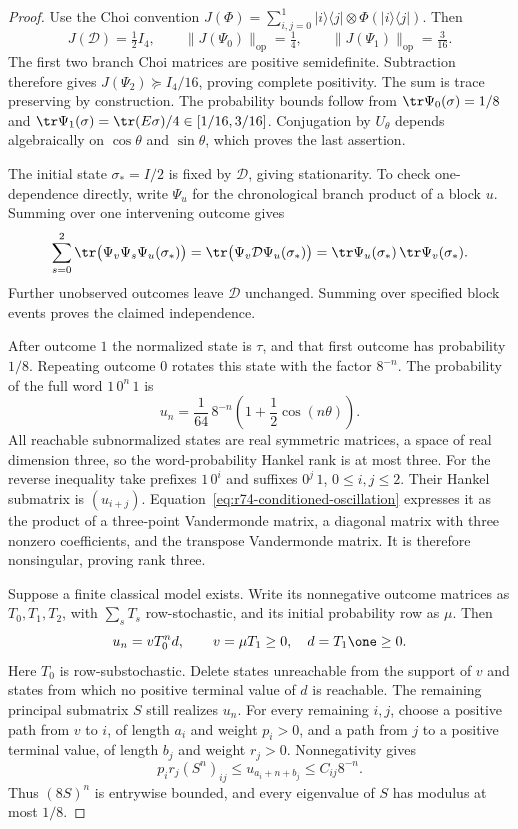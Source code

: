 \begin{proof}
Use the Choi convention
$J(\Phi)=\sum_{i,j=0}^1|i\rangle\langle j|\otimes
\Phi(|i\rangle\langle j|)$. Then
\[
 J(\mathcal D)=\tfrac12I_4,
 \qquad \|J(\Psi_0)\|_{\mathrm{op}}=\tfrac14,
 \qquad \|J(\Psi_1)\|_{\mathrm{op}}=\tfrac3{16}.
\]
The first two branch Choi matrices are positive semidefinite. Subtraction
therefore gives $J(\Psi_2)\succeq I_4/16$, proving complete positivity.
The sum is trace preserving by construction. The probability bounds follow
from $\tr\Psi_0(\sigma)=1/8$ and
$\tr\Psi_1(\sigma)=\tr(E\sigma)/4\in[1/16,3/16]$.
Conjugation by $U_\theta$ depends algebraically on $\cos\theta$ and
$\sin\theta$, which proves the last assertion.

The initial state $\sigma_*=I/2$ is fixed by $\mathcal D$, giving
stationarity. To check one-dependence directly, write $\Psi_u$ for the
chronological branch product of a block $u$. Summing over one intervening
outcome gives
\[
 \sum_{s=0}^2\tr\bigl(\Psi_v\Psi_s\Psi_u(\sigma_*)\bigr)
 =\tr\bigl(\Psi_v\mathcal D\Psi_u(\sigma_*)\bigr)
 =\tr\Psi_u(\sigma_*)\,\tr\Psi_v(\sigma_*).
\]
Further unobserved outcomes leave $\mathcal D$ unchanged. Summing over
specified block events proves the claimed independence.

After outcome $1$ the normalized state is $\tau$, and that first outcome
has probability $1/8$. Repeating outcome $0$ rotates this state with
the factor $8^{-n}$. The probability of the full word $1\,0^n\,1$ is
\begin{equation}\label{eq:r74-conditioned-oscillation}
 u_n=\frac1{64}\,8^{-n}
       \left(1+\frac12\cos(n\theta)\right).
\end{equation}
All reachable subnormalized states are real symmetric matrices, a space
of real dimension three, so the word-probability Hankel rank is at most
three. For the reverse inequality take prefixes $1\,0^i$ and suffixes
$0^j\,1$, $0\le i,j\le2$. Their Hankel submatrix is $(u_{i+j})$.
Equation~\eqref{eq:r74-conditioned-oscillation} expresses it as the
product of a three-point Vandermonde matrix, a diagonal matrix with three
nonzero coefficients, and the transpose Vandermonde matrix. It is therefore
nonsingular, proving rank three.

Suppose a finite classical model exists. Write its nonnegative outcome
matrices as $T_0,T_1,T_2$, with $\sum_sT_s$ row-stochastic, and its initial
probability row as $\mu$. Then
\[
 u_n=vT_0^nd,\qquad v=\mu T_1\ge0,\quad d=T_1\one\ge0.
\]
Here $T_0$ is row-substochastic. Delete states unreachable from the support
of $v$ and states from which no positive terminal value of $d$ is reachable.
The remaining principal submatrix $S$ still realizes $u_n$. For every
remaining $i,j$, choose a positive path from $v$ to $i$, of length $a_i$
and weight $p_i>0$, and a path from $j$ to a positive terminal value, of
length $b_j$ and weight $r_j>0$. Nonnegativity gives
\[
 p_ir_j(S^n)_{ij}\le u_{a_i+n+b_j}\le C_{ij}8^{-n}.
\]
Thus $(8S)^n$ is entrywise bounded, and every eigenvalue of $S$ has modulus
at most $1/8$.


\end{proof}
